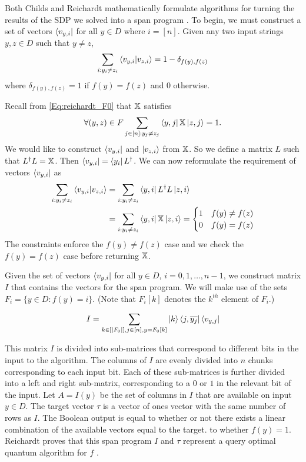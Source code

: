 Both Childs and Reichardt mathematically formulate
algorithms for turning the results of the SDP we solved
into a span program \cite{reichardt2009span, childs}.
To begin, we must construct a set of vectors
$\bra{v_{y,i}}$ for all $y \in D$ where $i = [n]$.
Given any two input strings $y, z \in D$ such that $y\neq z$,
\begin{align}
    \sum_{i: y_i \ne z_i} \braket{v_{y,i}|v_{z,i}} = 1 - \delta_{f(y), f(z)} \nonumber
\end{align}
where $\delta_{f(y), f(z)} = 1$ if $f(y) = f(z)$ and $0$ otherwise.

Recall from \cref{Eq:reichardt_F0} that $\operatorname{\mathbb{X}}$ satisfies
\begin{align}
    \forall (y,z) \in F \sum_{j \in [n]: y_j \ne z_j} 
    \bra{y,j} \operatorname{\mathbb{X}} \ket{z, j} = 1 \nonumber.
\end{align}
We would like to construct $\bra{v_{y,i}}$ and $\ket{v_{z,i}}$
from $\operatorname{\mathbb{X}}$.
So we define a matrix $L$ such that $L^\dagger L = \operatorname{\mathbb{X}}$.
Then $\bra{v_{y,i}} = \bra{y_i}L^\dagger$.
We can now reformulate the requirement of vectors $\bra{v_{y,i}}$
as
\begin{align}
    \sum_{i: y_i \ne z_i} \braket{v_{y,i}|v_{z,i}} &= \sum_{i: y_i \ne z_i}
    \bra{y,i} L^\dagger L \ket{z, i} \nonumber \\
    &= \sum_{i: y_i \ne z_i} \bra{y,i} \operatorname{\mathbb{X}} \ket{z, i} = \begin{cases}
        1 & f(y) \ne f(z) \\
        0 & f(y) = f(z)
    \end{cases} \nonumber 
\end{align}
The constraints enforce the $f(y) \neq f(z)$ case and we
check the $f(y) = f(z)$ case before returning $\operatorname{\mathbb{X}}$.

Given the set of vectors $\bra{v_{y,i}}$ for all $y \in
D$, $i = 0, 1, \ldots , n-1$, we construct 
matrix $I$ that contains the vectors for the span
program. We will make use of the sets $F_i =
\{y \in D: f(y) = i\}$.
(Note that $F_i[k]$ denotes the $k^{th}$ element of $F_i$.)

\begin{align}
    I = \sum_{k \in [|F_0|], j \in [n], y = F_0[k]}
    \ket{k}\bra{j, \overline{y_j}} \bra{v_{y,j}}
    \nonumber
\end{align}

This matrix $I$ is divided into sub-matrices that
correspond to different bits in the input to the
algorithm.
The columns of $I$ are evenly divided into
$n$ chunks corresponding to each input bit.
Each of these sub-matrices is further divided into a left and
right sub-matrix, corresponding to a $0$ or $1$
in the relevant bit of the input.
Let $A=I(y)$ be the set of columns in $I$ that are available
on input $y \in D$.
The target vector $\tau$ is a vector of ones vector with the same number
of rows as $I$. The Boolean output is equal to whether or not there exists a linear
combination of the available vectors equal to the target.
to whether $f(y) = 1$.
Reichardt proves that this span program $I$ and $\tau$ represent a query optimal quantum algorithm for $f$ \cite{reichardt2009span}.
